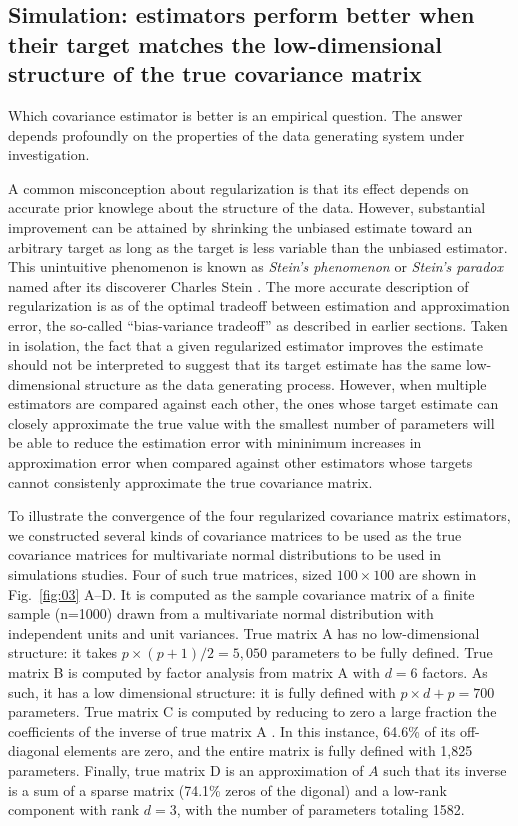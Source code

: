 \subsection*{Simulation: estimators perform better when their target matches the low-dimensional structure of the true covariance matrix}


Which covariance estimator is better is an empirical question.  The answer depends profoundly on the properties of the data generating system under investigation. 

A common misconception about regularization is that its effect depends on accurate prior knowlege about the structure of the data. However, substantial improvement can be attained by shrinking the unbiased estimate toward an arbitrary target as long as the target is less variable than the unbiased estimator.  This unintuitive phenomenon is known as \emph{Stein's phenomenon} or \emph{Stein's paradox} \cite{Efron:1977} named after its discoverer Charles Stein \cite{Stein:1956}.
The more accurate description of regularization is as of the optimal tradeoff between estimation and approximation error, the so-called ``bias-variance tradeoff'' as described in earlier sections. 
Taken in isolation, the fact that a given regularized estimator improves the estimate should not be interpreted to suggest that its target estimate has the same low-dimensional structure as the data generating process.   However, when multiple estimators are compared against each other, the ones whose target estimate can closely approximate the true value with the smallest number of parameters will be able to reduce the estimation error with mininimum increases in approximation error when compared against other estimators whose targets cannot consistenly approximate the true covariance matrix.  

To illustrate the convergence of the four regularized covariance matrix estimators,  we constructed several kinds of covariance matrices to be used as the true covariance matrices for multivariate normal distributions to be used in simulations studies. Four of such true matrices, sized $100\times100$ are shown in Fig.~\ref{fig:03} A--D.  It is computed as the sample covariance matrix of a finite sample (n=1000) drawn from a multivariate normal distribution with independent units and unit variances.  True matrix A has no low-dimensional structure: it takes $p\times(p+1)/2=5,050$ parameters to be fully defined.  True matrix B is computed by factor analysis from matrix A with $d=6$ factors.  As such, it has a low dimensional structure: it is fully defined with $p\times d +p = 700$ parameters.  True matrix C is computed by reducing to zero a large fraction the coefficients of the inverse of true matrix A . In this instance, 64.6\% of its off-diagonal elements are zero, and the entire matrix is fully defined with 1,825 parameters. Finally, true matrix D is an approximation of $A$ such that its inverse is a sum of a sparse matrix (74.1\% zeros of the digonal) and a low-rank component with rank $d=3$, with the number of parameters totaling 1582.

